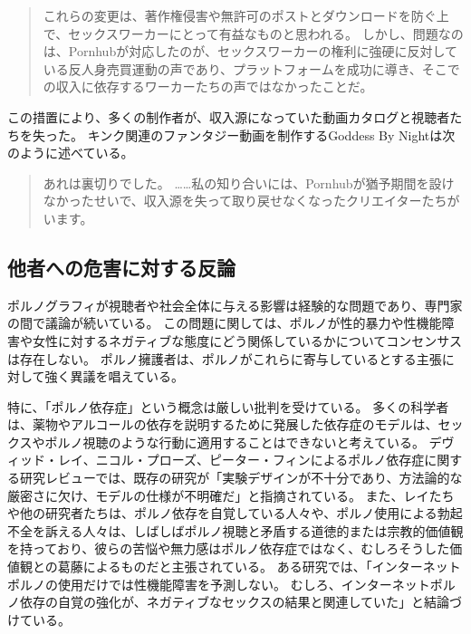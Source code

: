 \documentclass[paper=a4,book,openany]{jlreq} \usepackage{mystyle}
\begin{document}
\begin{quote}
これらの変更は、著作権侵害や無許可のポストとダウンロードを防ぐ上で、セックスワーカーにとって有益なものと思われる。
しかし、問題なのは、Pornhubが対応したのが、セックスワーカーの権利に強硬に反対している反人身売買運動の声であり、プラットフォームを成功に導き、そこでの収入に依存するワーカーたちの声ではなかったことだ。
\citep{toronto21:_what_do_pornh_chang_mean_sex_worker}
\end{quote}

この措置により、多くの制作者が、収入源になっていた動画カタログと視聴者たちを失った。
キンク関連のファンタジー動画を制作するGoddess By Nightは次のように述べている。

\begin{quote}
あれは裏切りでした。
……私の知り合いには、Pornhubが猶予期間を設けなかったせいで、収入源を失って取り戻せなくなったクリエイターたちがいます。
\citep{cole20:_pornh_conten_purge_has_left}
\end{quote}

\subsection{他者への危害に対する反論}

ポルノグラフィが視聴者や社会全体に与える影響は経験的な問題であり、専門家の間で議論が続いている。
この問題に関しては、ポルノが性的暴力や性機能障害や女性に対するネガティブな態度にどう関係しているかについてコンセンサスは存在しない。
ポルノ擁護者は、ポルノがこれらに寄与しているとする主張に対して強く異議を唱えている。

特に、「ポルノ依存症」という概念は厳しい批判を受けている。
多くの科学者は、薬物やアルコールの依存を説明するために発展した依存症のモデルは、セックスやポルノ視聴のような行動に適用することはできないと考えている。
デヴィッド・レイ、ニコル・プローズ、ピーター・フィンによるポルノ依存症に関する研究レビューでは、既存の研究が「実験デザインが不十分であり、方法論的な厳密さに欠け、モデルの仕様が不明確だ」と指摘されている。
また、レイたちや他の研究者たちは、ポルノ依存を自覚している人々や、ポルノ使用による勃起不全を訴える人々は、しばしばポルノ視聴と矛盾する道徳的または宗教的価値観を持っており、彼らの苦悩や無力感はポルノ依存症ではなく、むしろそうした価値観との葛藤によるものだと主張されている\citep[p.105]{ley14:_emper_has_no_cloth}。
ある研究では、「インターネットポルノの使用だけでは性機能障害を予測しない。
むしろ、インターネットポルノ依存の自覚の強化が、ネガティブなセックスの結果と関連していた」と結論づけている\citep{whelan21:_pornog_addic}。
\end{document}
